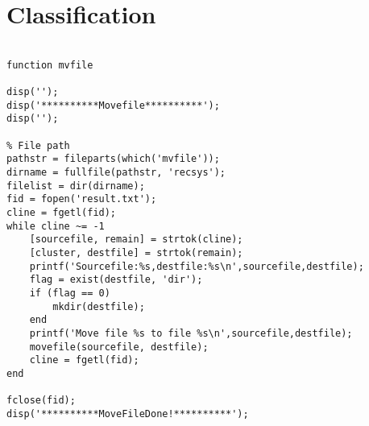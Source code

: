 \section{Classification}
\lstset{language=Matlab}         
 
\begin{lstlisting}[frame=single]

function mvfile

disp('');
disp('**********Movefile**********');
disp('');

% File path
pathstr = fileparts(which('mvfile'));
dirname = fullfile(pathstr, 'recsys');
filelist = dir(dirname);
fid = fopen('result.txt');
cline = fgetl(fid);
while cline ~= -1
    [sourcefile, remain] = strtok(cline);
    [cluster, destfile] = strtok(remain);
    printf('Sourcefile:%s,destfile:%s\n',sourcefile,destfile);
    flag = exist(destfile, 'dir');
    if (flag == 0)
        mkdir(destfile);
    end
    printf('Move file %s to file %s\n',sourcefile,destfile);
    movefile(sourcefile, destfile);
    cline = fgetl(fid);
end

fclose(fid);
disp('**********MoveFileDone!**********');

\end{lstlisting}
